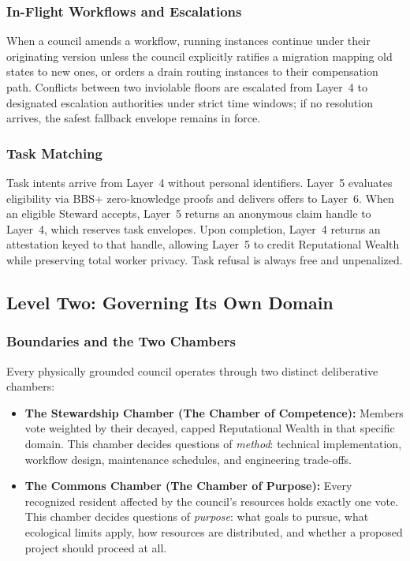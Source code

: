 \subsubsection{In-Flight Workflows and Escalations}

When a council amends a workflow, running instances continue under their originating version unless the council explicitly ratifies a migration mapping old states to new ones, or orders a drain routing instances to their compensation path. Conflicts between two inviolable floors are escalated from Layer~4 to designated escalation authorities under strict time windows; if no resolution arrives, the safest fallback envelope remains in force.

\subsubsection{Task Matching}
\label{sec:l5-matching}

Task intents arrive from Layer~4 without personal identifiers. Layer~5 evaluates eligibility via BBS+ zero-knowledge proofs and delivers offers to Layer~6. When an eligible Steward accepts, Layer~5 returns an anonymous claim handle to Layer~4, which reserves task envelopes. Upon completion, Layer~4 returns an attestation keyed to that handle, allowing Layer~5 to credit Reputational Wealth while preserving total worker privacy. Task refusal is always free and unpenalized.

\subsection{Level Two: Governing Its Own Domain}
\label{subsec:l5-level-two}

\subsubsection{Boundaries and the Two Chambers}

Every physically grounded council operates through two distinct deliberative chambers:
\begin{itemize}
  \item \textbf{The Stewardship Chamber (The Chamber of Competence):} Members vote weighted by their decayed, capped Reputational Wealth in that specific domain. This chamber decides questions of \textit{method}: technical implementation, workflow design, maintenance schedules, and engineering trade-offs.
  \item \textbf{The Commons Chamber (The Chamber of Purpose):} Every recognized resident affected by the council's resources holds exactly one vote. This chamber decides questions of \textit{purpose}: what goals to pursue, what ecological limits apply, how resources are distributed, and whether a proposed project should proceed at all.
\end{itemize}

